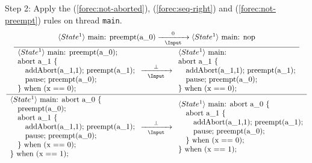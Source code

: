 \noindent
Step 2: Apply the (\ref{forec:not-aborted}), (\ref{forec:seq-right}) and 
(\ref{forec:not-preempt}) rules on thread \verb$main$.
\begin{equation*}
	\frac{
		\dfrac{
				\langle State^1 \rangle ~ \text{main: preempt(a\_0)}
					\xrightarrow[~~\Input~~]{0}
				\langle State^1 \rangle ~ \text{main: nop}
			}{
				\begin{array}{l}
					\langle State^1 \rangle ~ \text{main: preempt(a\_0);}	\\
					\text{abort a\_1 \{}									\\
					\text{~~~addAbort(a\_1,1); preempt(a\_1);}				\\
					\text{~~~pause; preempt(a\_0);}							\\
					\text{\} when (x == 0);}					
				\end{array}
					\xrightarrow[~~\Input~~]{\bot} 
				\begin{array}{l}
					\langle State^1 \rangle ~ \text{main:}		\\
					\text{abort a\_1 \{}						\\
					\text{~~~addAbort(a\_1,1); preempt(a\_1);}	\\
					\text{~~~pause; preempt(a\_0);}				\\
					\text{\} when (x == 0);}					
				\end{array}
			}
		}{
			\begin{array}{l}
				\langle State^1 \rangle ~ \text{main: abort a\_0 \{}	\\
				\text{~~~preempt(a\_0);}								\\
				\text{~~~abort a\_1 \{}									\\
				\text{~~~~~~addAbort(a\_1,1); preempt(a\_1);}			\\
				\text{~~~~~~pause; preempt(a\_0);}						\\
				\text{~~~\} when (x == 0);}								\\
				\text{\} when (x == 1);}
			\end{array}
				\xrightarrow[~~\Input~~]{\bot} 
			\begin{array}{l}
				\langle State^1 \rangle ~ \text{main: abort a\_0 \{}\\
				\text{~~~abort a\_1 \{}								\\
				\text{~~~~~~addAbort(a\_1,1); preempt(a\_1);}		\\
				\text{~~~~~~pause; preempt(a\_0);}					\\
				\text{~~~\} when (x == 0);}							\\
				\text{\} when (x == 1);}
			\end{array}
		}
\end{equation*}
\newpage 

